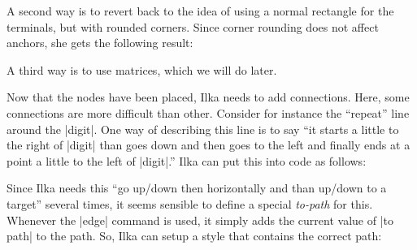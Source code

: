 A second way is to revert back to the idea of using a normal rectangle
for the terminals, but with rounded corners. Since corner rounding
does not affect anchors, she gets the following result:
\begin{codeexample}[]
\end{codeexample}
A third way is to use matrices, which we will do later.
 
Now that the nodes have been placed, Ilka needs to add
connections. Here, some connections are more difficult than
other. Consider for instance the ``repeat'' line around the
|digit|. One way of describing this line is to say ``it starts a
little to the right of |digit| than goes down and then goes to the
left and finally ends at a point a little to the left of |digit|.''
Ilka can put this into code as follows:
\begin{codeexample}[]
\end{codeexample}

Since Ilka needs this ``go up/down then horizontally and than up/down
to a target'' several times, it seems sensible to define a special
\emph{to-path} for this. Whenever the |edge| command is used, it
simply adds the current value of |to path| to the path. So, Ilka can
setup a style that contains the correct path:
\begin{codeexample}[]
\end{codeexample}

